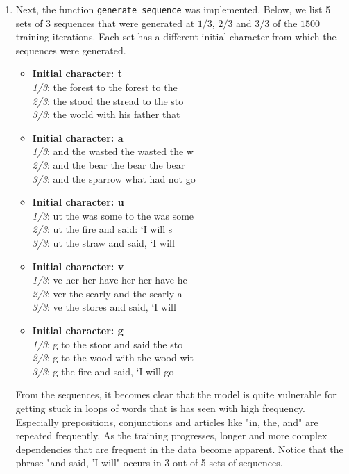 \documentclass{article}
\begin{document}
\begin{enumerate}[label = (\alph*)]
	\item Next, the function \texttt{generate\_sequence} was implemented. Below, we list 5 sets of 3 sequences that were generated at $1/3$, $2/3$ and $3/3$ of the $1500$ training iterations. Each set has a different initial character from which the sequences were generated.
	\begin{itemize}
		\item \textbf{Initial character: t}\\
		\textit{1/3}: the forest to the forest to the \\
		\textit{2/3}: the stood the stread to the sto \\
		\textit{3/3}: the world with his father that
		\item \textbf{Initial character: a}\\
		\textit{1/3}: and the wasted the wasted the w \\
		\textit{2/3}: and the bear the bear the bear  \\
		\textit{3/3}: and the sparrow what had not go
		\item \textbf{Initial character: u}\\
		\textit{1/3}: ut the was some to the was some \\
		\textit{2/3}: ut the fire and said: ‘I will s \\
		\textit{3/3}: ut the straw and said, ‘I will 
		\item \textbf{Initial character: v}\\
		\textit{1/3}: ve her her have her her have he \\
		\textit{2/3}: ver the searly and the searly a \\
		\textit{3/3}: ve the stores and said, ‘I will
		\item \textbf{Initial character: g}\\
		\textit{1/3}: g to the stoor and said the sto \\
		\textit{2/3}: g to the wood with the wood wit \\
		\textit{3/3}: g the fire and said, ‘I will go
	\end{itemize}
	From the sequences, it becomes clear that the model is quite vulnerable for getting stuck in loops of words that is has seen with high frequency. Especially prepositions, conjunctions and articles like "in, the, and" are repeated frequently. As the training progresses, longer and more complex dependencies that are frequent in the data become apparent. Notice that the phrase "and said, 'I will" occurs in 3 out of 5 sets of sequences. 

\end{enumerate}
\end{document}
